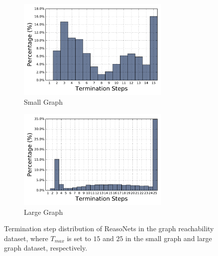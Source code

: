 \documentclass[sigconf]{acmart}
\begin{document}
\begin{figure}[t]
	\centering
	\begin{subfigure}{.44\textwidth}
		\centering
		\includegraphics[width=0.8\textwidth]{figure/small_histogram}%
		\caption{Small Graph}
	\end{subfigure}
	\begin{subfigure}{.44\textwidth}
		\centering
		\includegraphics[width=0.8\textwidth]{figure/large_histogram} %
		\caption{Large Graph}
	\end{subfigure}
	\caption{{Termination step distribution of ReasoNets in the graph reachability dataset, where $T_{max}$ is set to $15$ and $25$ in the small graph and large graph dataset, respectively.}}
	\label{fig:graph_termination_histogram}
\end{figure}
\end{document}
